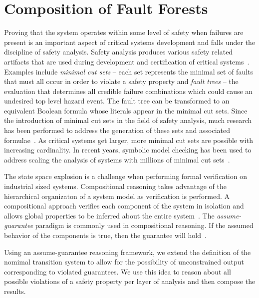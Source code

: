 \chapter{Composition of Fault Forests}
\label{chap:compFF}
Proving that the system operates within some level of safety when failures are present is an important aspect of critical systems development and falls under the discipline of safety analysis. Safety analysis produces various safety related artifacts that are used during development and certification of critical systems~\cite{SAE:ARP4754A}. Examples include {\em minimal cut sets} -- each set represents the minimal set of faults that must all occur in order to violate a safety property and {\em fault trees} -- the evaluation that determines all credible failure combinations which could cause an undesired top level hazard event. The fault tree can be transformed to an equivalent Boolean formula whose literals appear in the minimal cut sets. Since the introduction of minimal cut sets in the field of safety analysis, much research has been performed to address the generation of these sets and associated formulae~\cite{vesely1981fault,fta:survey,historyFTA}. As critical systems get larger, more minimal cut sets are possible with increasing cardinality. In recent years, symbolic model checking has been used to address scaling the analysis of systems with millions of minimal cut sets~\cite{bieber2002combination,schafer2003combining,symbFTA}. 

The state space explosion is a challenge when performing formal verification on industrial sized systems. Compositional reasoning takes advantage of the hierarchical organizaton of a system model as verification is performed. A compositional approach verifies each component of the system in isolation and allows global properties to be inferred about the entire system~\cite{berezin1997compositional}. The {\em assume-guarantee} paradigm is commonly used in compositional reasoning. If the assumed behavior of the components is true, then the guarantee will hold~\cite{NFM2012:CoGaMiWhLaLu}.

Using an assume-guarantee reasoning framework, we extend the definition of the nomimal transition system to allow for the possibility of unconstrained output corresponding to violated guarantees. We use this idea to reason about all possible violations of a safety property per layer of analysis and then compose the results.

